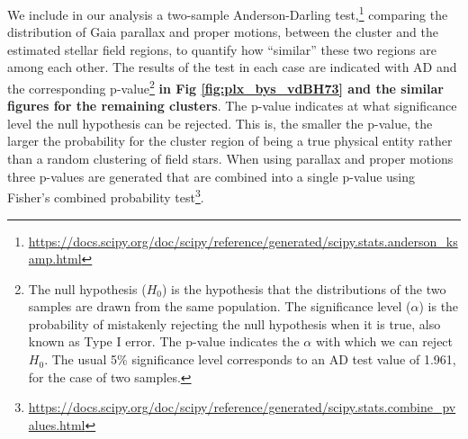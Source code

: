 \documentclass[referee]{aa}
\begin{document}
We include in our analysis a two-sample Anderson-Darling
test,\footnote{\url{https://docs.scipy.org/doc/scipy/reference/generated/scipy.stats.anderson_ksamp.html}}
comparing the distribution of Gaia parallax and proper motions,
between the cluster and the estimated stellar field regions, to quantify how
``similar'' these two regions are among each other.
The results of the test in each case are indicated with AD and the
corresponding p-value\footnote{The null hypothesis ($H_{0}$) is the
hypothesis that the distributions of the two samples are drawn from the same
population. The significance level ($\alpha$) is the probability of mistakenly
rejecting the null hypothesis when it is true, also known as Type I error. The
p-value indicates the $\alpha$ with which we can reject $H_{0}$. The usual 5\%
significance level corresponds to an AD test value of 1.961, for the case of two
samples.} \textbf{in Fig \ref{fig:plx_bys_vdBH73} and the similar figures for
the remaining clusters}.
The p-value indicates at what significance level the null hypothesis
can be rejected. This is, the smaller the p-value, the larger the probability
for the cluster region of being a true physical entity rather than a random
clustering of field stars. When using parallax and proper motions three
p-values are generated that are combined into a single p-value using Fisher's
combined probability
test\footnote{\url{https://docs.scipy.org/doc/scipy/reference/generated/scipy.stats.combine_pvalues.html}}.






\end{document}
